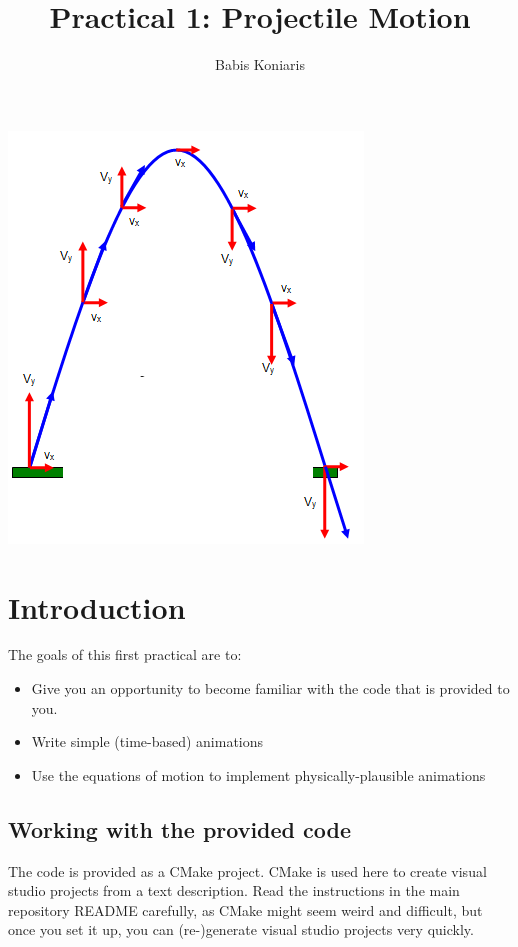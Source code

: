 \documentclass[12pt]{article}
\title{\textbf{Practical 1: Projectile Motion}}
\author{Babis Koniaris}
\date{}
\begin{document}
\maketitle

\begin{center}
\includegraphics[scale=1]{p1-teaser.png}
\end{center}
\pagebreak

\section*{Introduction}

The goals of this first practical are to:

\begin{itemize}
\item Give you an opportunity to become familiar with the code that is provided to you.
\item Write simple (time-based) animations
\item Use the equations of motion to implement physically-plausible animations
\end{itemize}

\subsection*{Working with the provided code}

The code is provided as a CMake project. CMake is used here to create visual studio projects from a text description. Read the instructions in the main repository README carefully, as CMake might seem weird and difficult, but once you set it up, you can (re-)generate visual studio projects very quickly.
\end{document}
